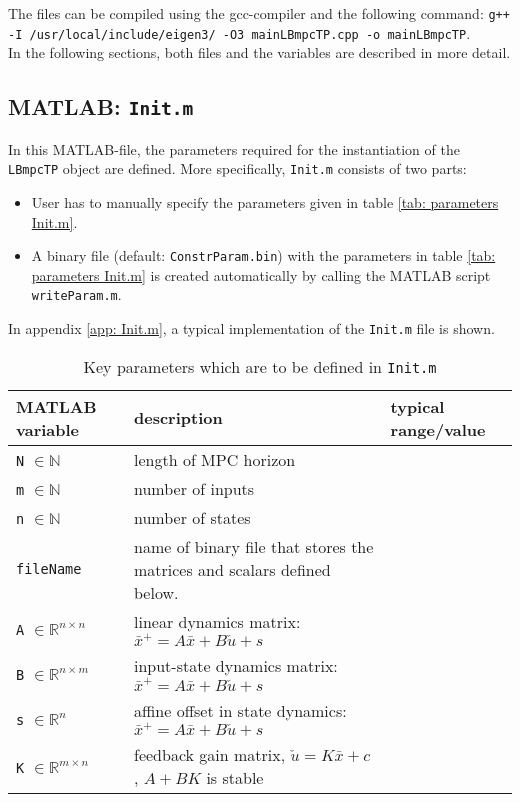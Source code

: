 \documentclass[letter]{article}
\begin{document}
\begin{sffamily}
\noindent
The files can be compiled using the gcc-compiler and the following command: \newline
\texttt{g++ -I /usr/local/include/eigen3/ -O3 mainLBmpcTP.cpp -o mainLBmpcTP}. \\


\noindent
In the following sections, both files and the variables are described in more detail.
\subsection{MATLAB: \texttt{Init.m}}
In this MATLAB-file, the parameters required for the instantiation of the \texttt{LBmpcTP} object are defined. More specifically, \texttt{Init.m} consists of two parts:
\begin{itemize}
	\item User has to manually specify the parameters given in table \ref{tab: parameters Init.m}.
	\item A binary file (default: \texttt{ConstrParam.bin}) with the parameters in table \ref{tab: parameters Init.m} is created automatically by calling the MATLAB script \texttt{writeParam.m}.
\end{itemize}
In appendix \ref{app: Init.m}, a typical implementation of the \texttt{Init.m} file is shown. \\

\begin{table}[!htdp]
\caption{Key parameters which are to be defined in \texttt{Init.m}}
\begin{center}
\begin{tabular}{|l|l|l|}\hline
{\bf MATLAB variable} & description & typical range/value \\ \hline\hline

 \texttt{N} $\in\mathbb{N}$ & length of MPC horizon & \\ \hline
 \texttt{m} $\in\mathbb{N}$ & number of inputs & \\ \hline
 \texttt{n} $\in\mathbb{N}$ & number of states & \\ \hline \hline
 
 \texttt{fileName} & name of binary file that stores the matrices and scalars defined below. & \\ \hline \hline
 
 \texttt{A} $\in\mathbb{R}^{n\times n}$ & linear dynamics matrix: $\bar{x}^+ = A\bar{x}+B\check{u}+s$ & \\ \hline
 \texttt{B} $\in\mathbb{R}^{n\times m}$ & input-state dynamics matrix: $\bar{x}^+ = A\bar{x}+B\check{u}+s$ & \\ \hline
 \texttt{s} $\in\mathbb{R}^{n}$ & affine offset in state dynamics:  $\bar{x}^+ = A\bar{x}+B\check{u}+s$ & \\ \hline
 \texttt{K} $\in\mathbb{R}^{m\times n}$  & feedback gain matrix, $\check{u}=K\bar{x}+c$, $A+BK$ is stable & \\ \hline \hline
  

\end{tabular}
\end{center}
\end{table}
\end{sffamily}
\end{document}
